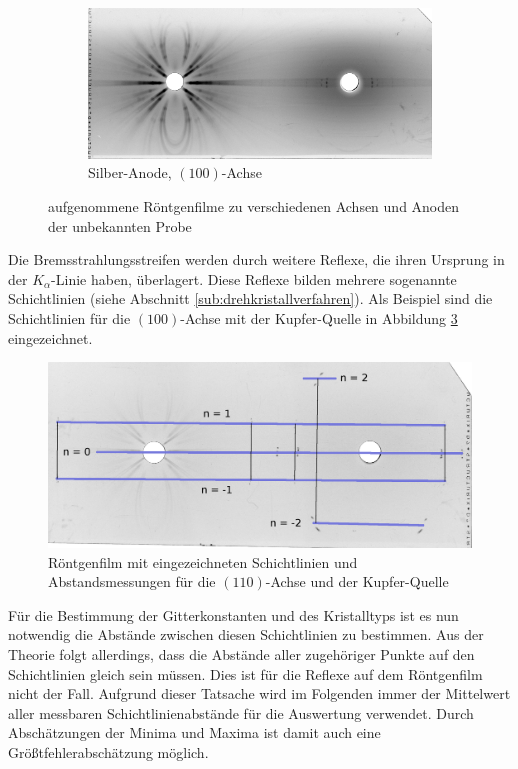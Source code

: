 \begin{figure}[H]
		\begin{subfigure}[b]{\textwidth}
			\centering
			\includegraphics[scale=0.53]{images/ag-100.png}
			\caption{Silber-Anode, $(100)$-Achse}
			\label{fig:ag-100}
		\end{subfigure}
		\caption{aufgenommene Röntgenfilme zu verschiedenen Achsen und Anoden der unbekannten Probe}
		\label{fig:x-ray-film}
	\end{figure}

	Die Bremsstrahlungsstreifen werden durch weitere Reflexe, die ihren Ursprung in der $K_\alpha$-Linie haben, überlagert.
	Diese Reflexe bilden mehrere sogenannte Schichtlinien (siehe Abschnitt \ref{sub:drehkristallverfahren}).
	Als Beispiel sind die Schichtlinien für die $(100)$-Achse mit der Kupfer-Quelle in Abbildung \ref{fig:marker} eingezeichnet.

	\begin{figure}[htb]
		\centering
		\includegraphics[scale=0.68]{images/cu-100-marker.png}
		\caption{Röntgenfilm mit eingezeichneten Schichtlinien und Abstandsmessungen für die $(110)$-Achse und der Kupfer-Quelle}
		\label{fig:marker}
	\end{figure}

	Für die Bestimmung der Gitterkonstanten und des Kristalltyps ist es nun notwendig die Abstände zwischen diesen Schichtlinien zu bestimmen.
	Aus der Theorie folgt allerdings, dass die Abstände aller zugehöriger Punkte auf den Schichtlinien gleich sein müssen.
	Dies ist für die Reflexe auf dem Röntgenfilm nicht der Fall.
	Aufgrund dieser Tatsache wird im Folgenden immer der Mittelwert aller messbaren Schichtlinienabstände für die Auswertung verwendet.
	Durch Abschätzungen der Minima und Maxima ist damit auch eine Größtfehlerabschätzung möglich.

